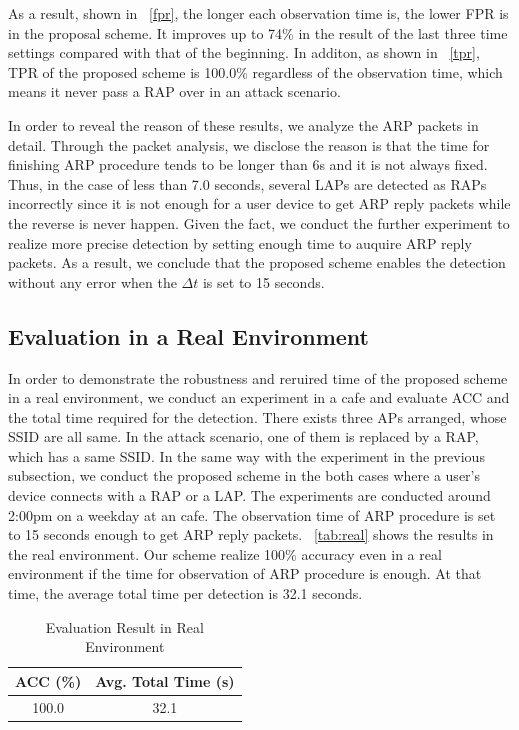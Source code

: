 \documentclass[conference]{IEEEtran}
\begin{document}
As a result, shown in \figurename~\ref{fpr}, the longer each observation time is, the lower FPR is in the proposal scheme.
It improves up to 74\% in the result of the last three time settings compared with that of the beginning.
In additon, as shown in \figurename~\ref{tpr}, TPR of the proposed scheme is 100.0\% regardless of the observation time, which means it never pass a RAP over in an attack scenario.

In order to reveal the reason of these results, we analyze the ARP packets in detail.
Through the packet analysis, we disclose the reason is that the time for finishing ARP procedure tends to be longer than 6s and it is not always fixed.
Thus, in the case of less than 7.0 seconds, several LAPs are detected as RAPs incorrectly since it is not enough for a user device to get ARP reply packets while the reverse is never happen.
Given the fact, we conduct the further experiment to realize more precise detection by setting enough time to auquire ARP reply packets.
As a result, we conclude that the proposed scheme enables the detection without any error when the $\Delta t$ is set to 15 seconds.

\subsection{Evaluation in a Real Environment}
In order to demonstrate the robustness and reruired time of the proposed scheme in a real environment, we conduct an experiment in a cafe and evaluate ACC and the total time required for the detection.
There exists three APs arranged, whose SSID are all same.
In the attack scenario, one of them is replaced by a RAP, which has a same SSID.
In the same way with the experiment in the previous subsection, we conduct the proposed scheme in the both cases where a user's device connects with a RAP or a LAP.
The experiments are conducted around 2:00pm on a weekday at an cafe.
The observation time of ARP procedure is set to 15 seconds enough to get ARP reply packets.
\tablename~\ref{tab:real} shows the results in the real environment.
Our scheme realize 100\% accuracy even in a real environment if the time for observation of ARP procedure is enough.
At that time, the average total time per detection is 32.1 seconds.

\begin{table}[htb] 
    \begin{center}
        \caption{Evaluation Result in Real Environment}
        \begin{tabular}{c c} \hline
            ACC (\%) & Avg. Total Time (s) \\ \hline \hline
            100.0 & 32.1 \\ \hline
        \end{tabular}
    \end{center}
\end{table}
\end{document}
